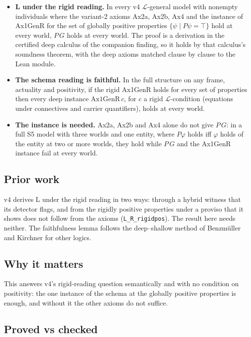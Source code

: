 \documentclass{article}
\begin{document}
\begin{itemize}
\item \textbf{L under the rigid reading.} In every v4 $\mathcal L$-general model with nonempty individuals where the variant-2 axioms Ax2a, Ax2b, Ax4 and the instance of Ax1GenR for the set of globally positive properties $\{\psi \mid P\psi=\top\}$ hold at every world, $P\,G$ holds at every world. The proof is a derivation in the certified deep calculus of the companion finding, so it holds by that calculus's soundness theorem, with the deep axioms matched clause by clause to the Lean module.
\item \textbf{The schema reading is faithful.} In the full structure on any frame, actuality and positivity, if the rigid Ax1GenR holds for every set of properties then every deep instance $\mathrm{Ax1GenR}\,c$, for $c$ a rigid $\mathcal L$-condition (equations under connectives and carrier quantifiers), holds at every world.
\item \textbf{The instance is needed.} Ax2a, Ax2b and Ax4 alone do not give $P\,G$: in a full S5 model with three worlds and one entity, where $P\varphi$ holds iff $\varphi$ holds of the entity at two or more worlds, they hold while $P\,G$ and the Ax1GenR instance fail at every world.
\end{itemize}

\subsection*{Prior work}

v4 derives L under the rigid reading in two ways: through a hybrid witness that its detector
flags, and from the rigidly positive properties under a proviso that it shows does not follow
from the axioms (\texttt{L\_R\_rigidpos}). The result here needs neither. The faithfulness lemma follows
the deep--shallow method of Benzmüller and Kirchner for other logics.

\subsection*{Why it matters}

This answers v4's rigid-reading question semantically and with no condition on positivity: the
one instance of the schema at the globally positive properties is enough, and without it the
other axioms do not suffice.

\subsection*{Proved vs checked}
\end{document}
